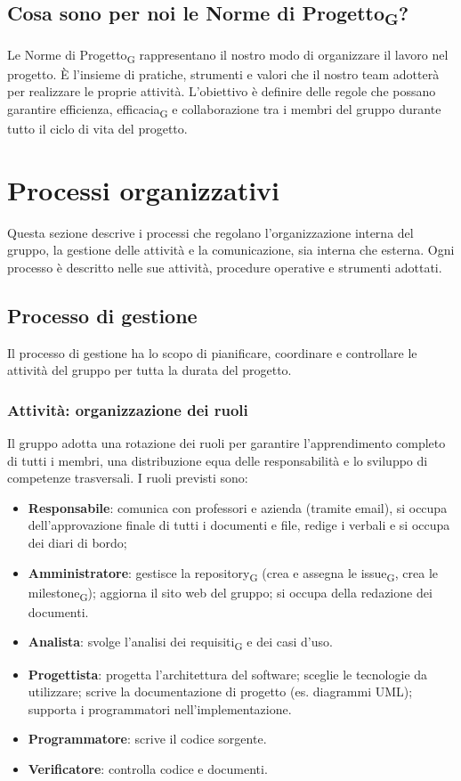 \documentclass[11pt,a4paper]{article}
\newcommand{\gls}[1]{#1\textsubscript{G}}
\begin{document}
\subsection{Cosa sono per noi le \gls{Norme di Progetto}?}
Le \gls{Norme di Progetto} rappresentano il nostro modo di organizzare il lavoro nel progetto. È l’insieme di pratiche, strumenti e valori che il nostro team adotterà per realizzare le proprie attività. L’obiettivo è definire delle regole che possano garantire efficienza, \gls{efficacia} e collaborazione tra i membri del gruppo durante tutto il ciclo di vita del progetto.

\newpage

\section{Processi organizzativi}
Questa sezione descrive i processi che regolano l'organizzazione interna del gruppo, la gestione delle attività e la comunicazione, sia interna che esterna. Ogni processo è descritto nelle sue attività, procedure operative e strumenti adottati.

\subsection{Processo di gestione}
Il processo di gestione ha lo scopo di pianificare, coordinare e controllare
le attività del gruppo per tutta la durata del progetto.

\subsubsection{Attività: organizzazione dei ruoli}
Il gruppo adotta una rotazione dei ruoli per garantire l'apprendimento completo di tutti i membri, una distribuzione equa delle responsabilità e lo sviluppo di competenze trasversali. I ruoli previsti sono:
\begin{itemize}
    \item \textbf{Responsabile}: comunica con professori e azienda (tramite email), si occupa dell'approvazione finale di tutti i documenti e file, redige i verbali e si occupa dei diari di bordo;
    \item \textbf{Amministratore}: gestisce la \gls{repository} (crea e assegna le \gls{issue}, crea le \gls{milestone}); aggiorna il sito web del gruppo; si occupa della redazione dei documenti.
    \item \textbf{Analista}: svolge l'\gls{analisi dei requisiti} e dei casi d'uso.
    \item \textbf{Progettista}: progetta l'architettura del software; sceglie le tecnologie da utilizzare; scrive la documentazione di progetto (es. diagrammi UML); supporta i programmatori nell'implementazione.
    \item \textbf{Programmatore}: scrive il codice sorgente.
    \item \textbf{Verificatore}: controlla codice e documenti.
\end{itemize}
\end{document}
